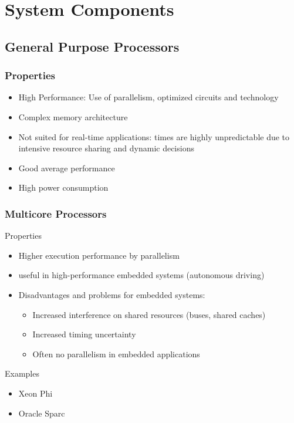 

\section{System Components}
\subsection{General Purpose Processors}


\subsubsection{Properties}
\begin{itemize}[noitemsep]
\item High Performance: Use of parallelism, optimized circuits and technology
\item Complex memory architecture
\item Not suited for real-time applications: times are highly unpredictable due to intensive resource sharing and dynamic decisions
\item Good average performance
\item High power consumption
\end{itemize}

\subsubsection{Multicore Processors}
Properties
\begin{itemize}[noitemsep]
\item Higher execution performance by parallelism
\item useful in high-performance embedded systems (autonomous driving)
\item Disadvantages and problems for embedded systems:
	\begin{itemize}[noitemsep]
	\item Increased interference on shared resources (buses, shared caches)
	\item Increased timing uncertainty
	\item Often no parallelism in embedded applications
	\end{itemize}
\end{itemize}

Examples
\begin{itemize}[noitemsep]
\item Xeon Phi
\item Oracle Sparc
\end{itemize}

